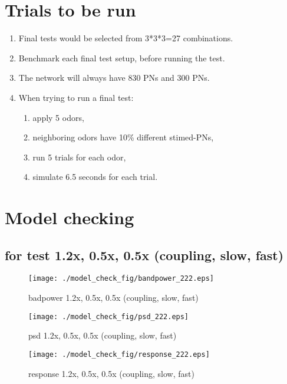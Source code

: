 \documentclass[11pt]{article}
\begin{document}
\section{Trials to be run}
\label{sec:org725256b}
\begin{enumerate}
\item Final tests would be selected from 3*3*3=27 combinations.
\label{sec:orgdf744a0}
\item Benchmark each final test setup, before running the test.
\label{sec:org0b4b8bf}
\item The network will always have 830 PNs and 300 PNs.
\label{sec:org751071d}
\item When trying to run a final test:
\label{sec:org3158923}
\begin{enumerate}
\item apply 5 odors,
\label{sec:org78a3e49}
\item neighboring odors have 10\% different stimed-PNs,
\label{sec:orge73a1f3}
\item run 5 trials for each odor,
\label{sec:org1cc563c}
\item simulate 6.5 seconds for each trial.
\label{sec:org70c5d78}
\end{enumerate}
\end{enumerate}


\section{Model checking}
\label{sec:org7c8de8a}

\subsection{for test 1.2x, 0.5x, 0.5x (coupling, slow, fast)}
\label{sec:org222}

\begin{figure}[htbp]
\centering
\texttt{[image: ./model\_check\_fig/bandpower\_222.eps]}
\caption{badpower 1.2x, 0.5x, 0.5x (coupling, slow, fast)}
\end{figure}

\begin{figure}[htbp]
\begin{center}
\texttt{[image: ./model\_check\_fig/psd\_222.eps]}
\caption{psd 1.2x, 0.5x, 0.5x (coupling, slow, fast)}
\end{center}
\end{figure}

\begin{figure}[htbp]
\begin{center}
\texttt{[image: ./model\_check\_fig/response\_222.eps]}
\caption{response 1.2x, 0.5x, 0.5x (coupling, slow, fast)}
\end{center}
\end{figure}
\end{document}
